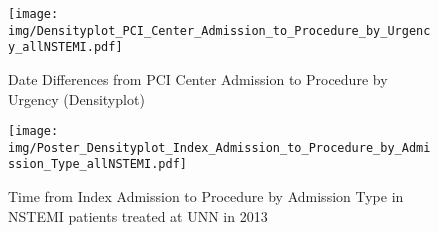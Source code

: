 \documentclass[presentation,xcolor=pdftex,dvipsnames,table,11pt]{beamer}
\begin{document}
\begin{tiny}
\begin{frame}
\begin{figure}
  \centering
  \caption{Date Differences from PCI Center Admission to Procedure by Urgency (Densityplot)}
  \label{Density: Date Differences from PCI Center Admission to Procedure by Urgency}
\texttt{[image: img/Densityplot\_PCI\_Center\_Admission\_to\_Procedure\_by\_Urgency\_allNSTEMI.pdf]}\end{figure}
\end{frame}




\begin{frame}
\begin{figure}
  \centering
  \caption{Time from Index Admission to Procedure by Admission Type in NSTEMI patients treated at UNN in 2013}
  \label{Density: Date Differences from Index Admission to Procedure by Admission Type allNSTEMI}
\texttt{[image: img/Poster\_Densityplot\_Index\_Admission\_to\_Procedure\_by\_Admission\_Type\_allNSTEMI.pdf]}\end{figure}
\end{frame}




\end{tiny}
\end{document}
